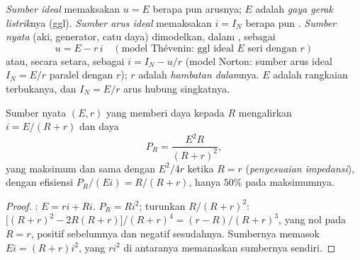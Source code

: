 \begin{definition}\label{def:b1:dc-circuits:sources}
\emph{Sumber  ideal} memaksakan $u = E$ berapa pun arusnya;
$E$ adalah \emph{gaya gerak listrik}nya (ggl). \emph{Sumber arus ideal}
memaksakan $i = I_N$ berapa pun . \emph{Sumber nyata}
(aki, generator, catu daya) dimodelkan, dalam ,
sebagai
\[
u = E - r\,i \quad (\text{model Thévenin: ggl ideal } E \text{ seri dengan } r)
\]
atau, secara setara, sebagai $i = I_N - u/r$ (model Norton: sumber arus
ideal $I_N = E/r$ paralel dengan $r$); $r$ adalah \emph{hambatan
dalam}nya. $E$ adalah  rangkaian terbukanya, dan $I_N = E/r$
arus hubung singkatnya.
\end{definition}

\begin{proposition}\label{prop:b1:dc-circuits:sourcepower}
Sumber nyata $(E, r)$ yang memberi daya kepada  $R$ mengalirkan
$i = E/(R + r)$ dan daya
\[
P_R = \frac{E^2 R}{(R + r)^2},
\]
yang maksimum dan sama dengan $E^2/4r$ ketika $R = r$
(\emph{penyesuaian impedansi}), dengan efisiensi $P_R/(Ei) = R/(R + r)$,
hanya $50\%$ pada maksimumnya.
\end{proposition}

\begin{proof}
: $E = ri + Ri$. $P_R = Ri^2$; turunkan $R/(R + r)^2$:
$\big[(R + r)^2 - 2R(R + r)\big]/(R + r)^4 = (r - R)/(R + r)^3$, yang
nol pada $R = r$, positif sebelumnya dan negatif sesudahnya. Sumbernya
memasok $Ei = (R + r)i^2$, yang $ri^2$ di antaranya memanaskan sumbernya sendiri.
\end{proof}

